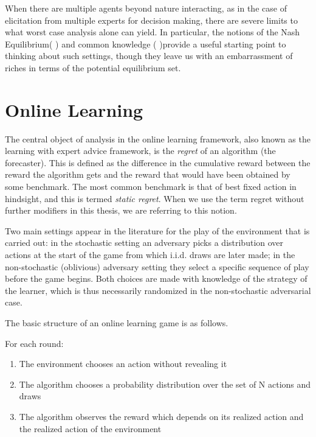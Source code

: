 When there are multiple agents beyond nature interacting, as in the case of elicitation from multiple experts for decision making, there are severe limits to what worst case analysis alone can yield. 
In particular, the notions of the Nash Equilibrium( \cite{nash1950equilibrium}) and common knowledge (\cite{aumann1976agreeing} )provide a useful starting point to thinking about such settings, though they leave us with an embarrassment of riches in terms of the potential equilibrium set.

\section{Online Learning}


The central object of analysis in the online learning framework, also known as the learning with expert advice framework, is the \emph{regret} of an algorithm (the forecaster). This is defined as the difference in the cumulative reward between the reward the algorithm gets and the reward that would have been obtained by some benchmark. 
The most common benchmark is that of best fixed action in hindsight, and this is termed \emph{static regret}. 
When we use the term regret without further modifiers in this thesis, we are referring to this notion.

Two main settings appear in the literature for the play of the environment that is carried out: in the stochastic setting an adversary picks a distribution over actions at the start of the game from which i.i.d. draws are later made; in the non-stochastic (oblivious) adversary setting they select a specific sequence of play before the game begins. Both choices are made with knowledge of the strategy of the learner, which is thus necessarily randomized in the non-stochastic adversarial case.

The basic structure of an online learning game is as follows.

For each round:
\begin{enumerate}
\item The environment chooses an action without revealing it
\item The algorithm chooses a probability distribution over the set of N actions and draws
\item The algorithm observes the reward which depends on its realized action and the realized action of the environment
\end{enumerate}

